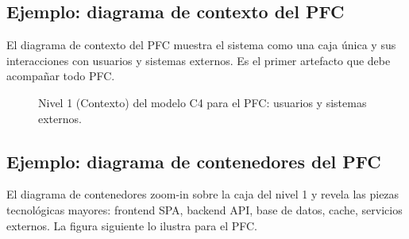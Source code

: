 \documentclass[11pt,a4paper,openany]{book}
\newcommand{\cfourPerson}[3]{%
  \node[circle,draw=blue!70!black,fill=blue!20,thick,
        minimum size=0.7cm,font=\tiny] (#1) at #2 {};%
  \node[below=0.05cm of #1,font=\scriptsize\bfseries,align=center] {#3};%
}
\newcommand{\cfourSystem}[3]{%
  \node[rectangle,draw=blue!70!black,fill=blue!10,thick,rounded corners,
        minimum width=2.5cm,minimum height=1.2cm,
        font=\scriptsize\bfseries,align=center] (#1) at #2 {#3};%
}
\begin{document}
\subsection{Ejemplo: diagrama de contexto del PFC}

El diagrama de contexto del PFC muestra el sistema como una
caja única y sus interacciones con usuarios y sistemas externos. Es
el primer artefacto que debe acompañar todo PFC.


\begin{figure}[htbp]
\centering
{}
\caption{Nivel 1 (Contexto) del modelo C4 para el PFC: usuarios y
sistemas externos.}
\end{figure}

\subsection{Ejemplo: diagrama de contenedores del PFC}

El diagrama de contenedores zoom-in sobre la caja del nivel
1 y revela las piezas tecnológicas mayores: frontend SPA, backend
API, base de datos, cache, servicios externos. La figura siguiente
lo ilustra para el PFC.
\end{document}
